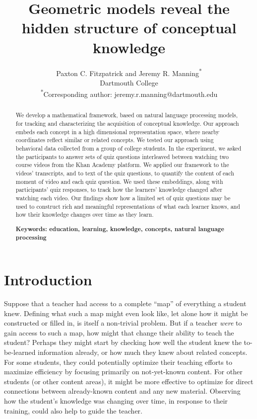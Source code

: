 \documentclass[10pt]{article}
\title{Geometric models reveal the hidden structure of conceptual knowledge}
\author{Paxton C. Fitzpatrick and Jeremy R.
Manning\textsuperscript{*}\\Dartmouth
College\\\textsuperscript{*}Corresponding author:
jeremy.r.manning@dartmouth.edu}
\date{}
\begin{document}
\maketitle

\begin{abstract} We develop a mathematical framework, based on natural language
processing models, for tracking and characterizing the acquisition of
conceptual knowledge. Our approach embeds each concept in a high dimensional
representation space, where nearby coordinates reflect similar or related
concepts. We tested our approach using behavioral data collected from a group
of college students. In the experiment, we asked the participants to answer
sets of quiz questions interleaved between watching two course videos from the
Khan Academy platform. We applied our framework to the videos' transcripts, and
to text of the quiz questions, to quantify the content of each moment of video
and each quiz question. We used these embeddings, along with participants' quiz
responses, to track how the learners' knowledge changed after watching each
video. Our findings show how a limited set of quiz questions may be used to
construct rich and meaningful representations of what each learner knows, and
how their knowledge changes over time as they learn.

\textbf{Keywords: education, learning, knowledge, concepts, natural language processing}

\end{abstract}


\section*{Introduction}

Suppose that a teacher had access to a complete ``map'' of everything a student
knew. Defining what such a map might even look like, let alone how it might be
constructed or filled in, is itself a non-trivial problem. But if a teacher
\textit{were} to gain access to such a map, how might that change their ability
to teach the student? Perhaps they might start by checking how well the student
knew the to-be-learned information already, or how much they knew about related
concepts. For some students, they could potentially optimize their teaching
efforts to maximize efficiency by focusing primarily on not-yet-known content.
For other students (or other content areas), it might be more effective to
optimize for direct connections between already-known content and any new
material. Observing how the student's knowledge was changing over time, in
response to their training, could also help to guide the teacher.
\end{document}
